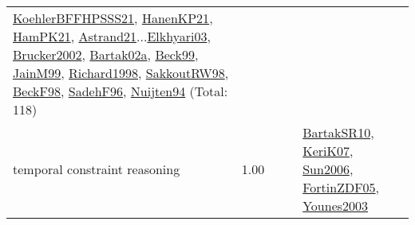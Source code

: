 {\begin{longtable}{p{3cm}r>{\raggedright\arraybackslash}p{6cm}>{\raggedright\arraybackslash}p{6cm}>{\raggedright\arraybackslash}p{8cm}}
\hyperref[detail:KoehlerBFFHPSSS21]{KoehlerBFFHPSSS21}, \hyperref[detail:HanenKP21]{HanenKP21}, \hyperref[detail:HamPK21]{HamPK21}, \hyperref[detail:Astrand21]{Astrand21}...\hyperref[detail:Elkhyari03]{Elkhyari03}, \hyperref[detail:Brucker2002]{Brucker2002}, \hyperref[detail:Bartak02a]{Bartak02a}, \hyperref[detail:Beck99]{Beck99}, \hyperref[detail:JainM99]{JainM99}, \hyperref[detail:Richard1998]{Richard1998}, \hyperref[detail:SakkoutRW98]{SakkoutRW98}, \hyperref[detail:BeckF98]{BeckF98}, \hyperref[detail:SadehF96]{SadehF96}, \hyperref[detail:Nuijten94]{Nuijten94} (Total: 118)\\
\index{temporal constraint reasoning}\index{Concepts!temporal constraint reasoning}temporal constraint reasoning &  1.00 &  &  & \hyperref[detail:BartakSR10]{BartakSR10}, \hyperref[detail:KeriK07]{KeriK07}, \hyperref[detail:Sun2006]{Sun2006}, \hyperref[detail:FortinZDF05]{FortinZDF05}, \hyperref[detail:Younes2003]{Younes2003}\\

\end{longtable}}
